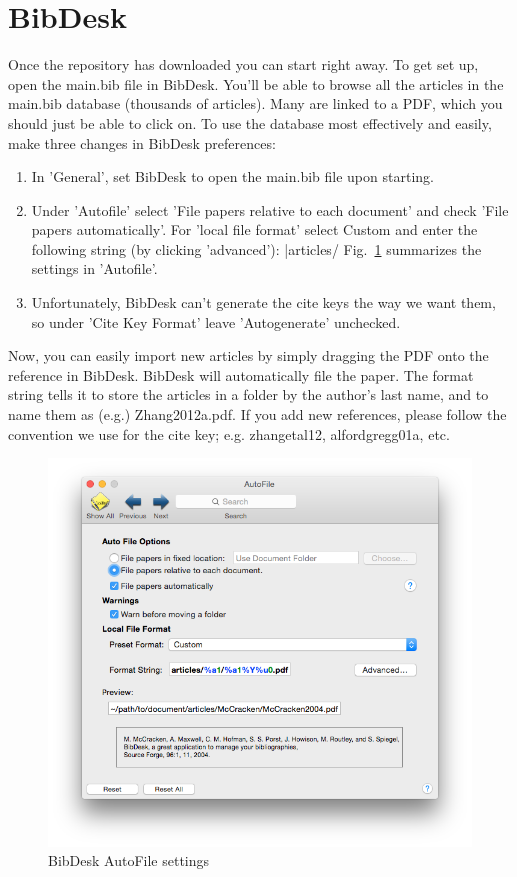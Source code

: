 \documentclass[11pt, oneside]{article}   	%
\begin{document}
\section{BibDesk}
Once the repository has downloaded you can start right away.  To get set up, open the main.bib file in BibDesk.  You'll be able to browse all the articles in the main.bib database (thousands of articles).  Many are linked to a PDF, which you should just be able to click on. To use the database most effectively and easily, make three changes in BibDesk preferences:
\begin{enumerate}
\item In 'General', set BibDesk to open the main.bib file upon starting. 
\item Under 'Autofile' select 'File papers relative to each document' and check 'File papers automatically'. For 'local file format' select Custom and enter the following string (by clicking 'advanced'): |articles/%
Fig.~\ref{fig:autofile} summarizes the settings in 'Autofile'.
\item Unfortunately, BibDesk can't generate the cite keys the way we want them, so under 'Cite Key Format' leave 'Autogenerate' unchecked.
\end{enumerate}

Now, you can easily import new articles by simply dragging the PDF onto the reference in BibDesk. BibDesk will automatically file the paper. The format string tells it to store the articles in a folder by the author's last name, and to name them as (e.g.) Zhang2012a.pdf.  If you add new references, please follow the convention we use for the cite key; e.g. zhangetal12, alfordgregg01a, etc.


\begin{figure}[h]
   \centering
   \includegraphics[width=1.0\textwidth]{bibdesk_autofile.png} %
   \caption{BibDesk AutoFile settings}
   \label{fig:autofile}
\end{figure}
\end{document}
